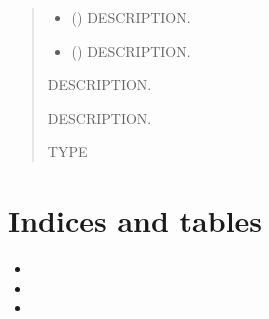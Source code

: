 \documentclass[letterpaper,10pt,english]{sphinxmanual}
\begin{document}

\begin{fulllineitems}
\label{\detokenize{utils:ggcas.utils.loadQuery}}
\pysigstartsignatures
{}
\pysigstopsignatures\begin{quote}\begin{description}
\begin{itemize}
\item {} 
\sphinxAtStartPar
{} () \textendash{} DESCRIPTION.

\item {} 
\sphinxAtStartPar
{} () \textendash{} DESCRIPTION.

\end{itemize}

\sphinxAtStartPar
{} \textendash{} DESCRIPTION.

\sphinxAtStartPar
{} \textendash{} DESCRIPTION.

\sphinxAtStartPar
TYPE

\end{description}\end{quote}

\end{fulllineitems}



\chapter{Indices and tables}
\label{\detokenize{index:indices-and-tables}}\begin{itemize}
\item {} 
\sphinxAtStartPar
{}

\item {} 
\sphinxAtStartPar
{}

\item {} 
\sphinxAtStartPar
{}

\end{itemize}
\end{document}
